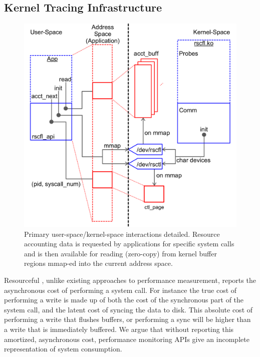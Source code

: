 \documentclass[letterpaper,twocolumn,10pt]{article}
\newcommand{\pname}{Resourceful}
\begin{document}


\subsection{Kernel Tracing Infrastructure}

\begin{figure}[ht!] \centering \includegraphics[width=\columnwidth]{sys_design}
\caption{Primary user-space/kernel-space interactions detailed. Resource
accounting data is requested by applications for specific system calls and is
then available for reading (zero-copy) from kernel buffer regions mmap-ed into
the current address space. } \label{fig:design} \end{figure}

\pname{ }, unlike existing approaches to performance measurement, reports the
asynchronous cost of performing a system call. For instance the true cost of
performing a write is made up of both the cost of the synchronous part of the
system call, and the latent cost of syncing the data to disk. This absolute cost
of performing a write that flushes buffers, or performing a sync will be higher
than a write that is immediately buffered. We argue that without reporting this
amortized, asynchronous cost, performance monitoring APIs give an incomplete
representation of system consumption.
\end{document}
